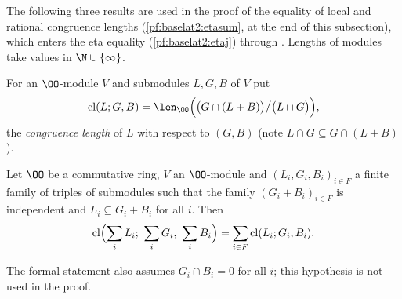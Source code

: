 The following three results are used in the proof of the equality of local and rational congruence
lengths (\cref{pf:baselat2:etasum}, at the end of this subsection), which enters the eta equality
(\cref{pf:baselat2:etaj}) through . Lengths of modules
take values in $\N\cup\{\infty\}$.

For an $\OO$-module $V$ and submodules $L,G,B$ of $V$ put
\[
  \mathrm{cl}(L;G,B)=\len_{\OO}\Bigl(\bigl(G\cap(L+B)\bigr)\big/\bigl(L\cap G\bigr)\Bigr),
\]
the \emph{congruence length} of $L$ with respect to $(G,B)$ (note $L\cap G\subseteq G\cap(L+B)$).

\begin{proposition}\label{pf:baselat2:cl}
Let $\OO$ be a commutative ring, $V$ an $\OO$-module and $(L_i,G_i,B_i)_{i\in F}$ a finite family of triples of
submodules such that the family $(G_i+B_i)_{i\in F}$ is independent and $L_i\subseteq G_i+B_i$ for all $i$. Then
\[
  \mathrm{cl}\Bigl(\sum_iL_i;\ \sum_iG_i,\ \sum_iB_i\Bigr)=\sum_{i\in F}\mathrm{cl}(L_i;G_i,B_i).
\]
\end{proposition}

\begin{remark}
The formal statement also assumes $G_i\cap B_i=0$ for all $i$; this hypothesis is not used in the proof.
\end{remark}

